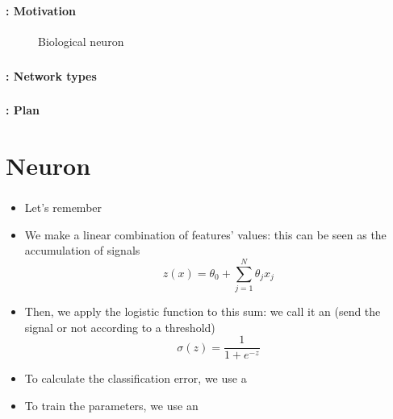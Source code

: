 \documentclass[xcolor=table]{beamer}
\subtitle[Advanced Neural Networks]{Advanced Neural Networks}
\begin{document}
\begin{frame}
	\frametitle{\inserttitle}
	\framesubtitle{\insertshortsubtitle: Motivation}

	\begin{figure}
		\centering
		\caption{Biological neuron \cite{2017-cain}}
	\end{figure}

\end{frame}

\begin{frame}
	\frametitle{\inserttitle}
	\framesubtitle{\insertshortsubtitle: Network types}
	
	
\end{frame}

\begin{frame}
	\frametitle{\inserttitle}
	\framesubtitle{\insertshortsubtitle: Plan}

	\begin{multicols}{2}
		\tableofcontents
	\end{multicols}
\end{frame}

\section{Neuron}

\begin{frame}
	\frametitle{\insertshortsubtitle}
	\framesubtitle{\insertsection}
	
	\begin{itemize}
		\item Let's remember 
		\item We make a linear combination of features' values: this can be seen as the accumulation of signals
		\[z(x) = \theta_0 + \sum\limits_{j=1}^{N} \theta_j x_j\]
		\item Then, we apply the logistic function to this sum: we call it an  (send the signal or not according to a threshold)
		\[\sigma(z) = \frac{1}{1 + e^{-z}}\]
		\item To calculate the classification error, we use a 
		\item To train the parameters, we use an 
	\end{itemize}

\end{frame}
\end{document}
